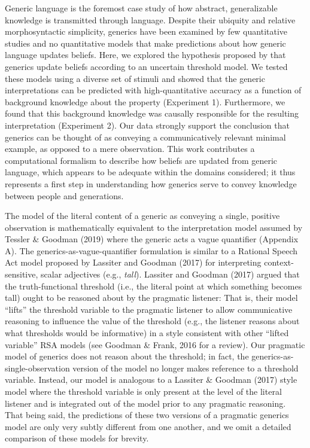 \documentclass[floatsintext,doc]{apa6}
\begin{document}
Generic language is the foremost case study of how abstract, generalizable knowledge is transmitted through language.
Despite their ubiquity and relative morphosyntactic simplicity, generics have been examined by few quantitative studies and no quantitative models that make predictions about how generic language updates beliefs.
Here, we explored the hypothesis proposed by  that generics update beliefs according to an uncertain threshold model. 
We tested these models using a diverse set of stimuli and showed that the generic interpretations can be predicted with high-quantitative accuracy as a function of background knowledge about the property (Experiment 1).
Furthermore, we found that this background knowledge was causally responsible for the resulting interpretation (Experiment 2).
Our data strongly support the conclusion that generics can be thought of as conveying a communicatively relevant minimal example, as opposed to a mere observation. 
This work contributes a computational formalism to describe how beliefs are updated from generic language, which appears to be adequate within the domains considered; it thus represents a first step in understanding how generics serve to convey knowledge between people and generations.


The model of the literal content of a generic as conveying a single, positive observation is mathematically equivalent to the interpretation model assumed by Tessler \& Goodman (2019) where the generic acts a vague quantifier (Appendix A). 
The generics-as-vague-quantifier formulation is similar to a Rational Speech Act model proposed by Lassiter and Goodman (2017) for interpreting context-sensitive, scalar adjectives (e.g., \emph{tall}).
Lassiter and Goodman (2017) argued that the truth-functional threshold (i.e., the literal point at which something becomes tall) ought to be reasoned about by the pragmatic listener: That is, their model ``lifts'' the threshold variable to the pragmatic listener to allow communicative reasoning to influence the value of the threshold (e.g., the listener reasons about what thresholds would be informative) in a style consistent with other ``lifted variable'' RSA models (see Goodman \& Frank, 2016 for a review). 
Our pragmatic model of generics does not reason about the threshold; in fact, the generics-as-single-observation version of the model no longer makes reference to a threshold variable. 
Instead, our model is analogous to a Lassiter \& Goodman (2017) style model where the threshold variable is only present at the level of the literal listener and is integrated out of the model prior to any pragmatic reasoning. 
That being said, the predictions of these two versions of a pragmatic generics model are only very subtly different from one another, and we omit a detailed comparison of these models for brevity. 
\end{document}
